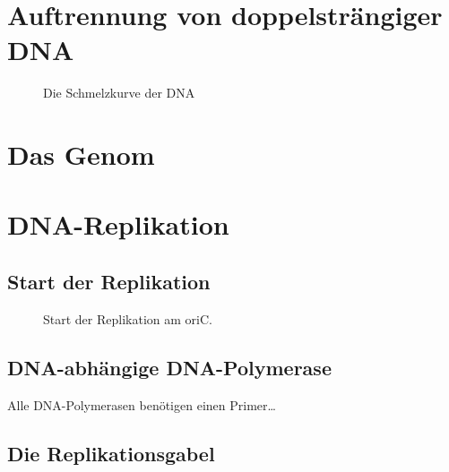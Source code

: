 
\section{Auftrennung von doppelsträngiger DNA}\label{sec:auftrennung-von-doppelstrangiger-dna}

\begin{figure}[H]
    \caption{Die Schmelzkurve der DNA}\label{fig:figure8}
\end{figure}


\section{Das Genom}\label{sec:das-genom}





\section{DNA-Replikation}\label{sec:dna-replikation}



\subsection{Start der Replikation}\label{subsec:start-der-replikation}

\begin{figure}[H]
    \caption{Start der Replikation am oriC.}\label{fig:figure2}
\end{figure}

\subsection{DNA-abhängige DNA-Polymerase}\label{subsec:dna-abhangige-dna-polymerase}

Alle DNA-Polymerasen benötigen einen Primer\ldots

\subsection{Die Replikationsgabel}\label{subsec:die-replikationsgabel}

